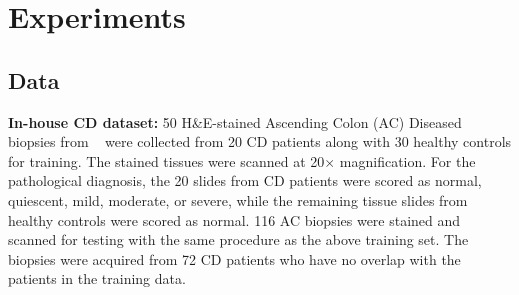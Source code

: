 \documentclass[times,twocolumn,final]{elsarticle}
\begin{document}

\section{Experiments}
\subsection{Data}
\textbf{In-house CD dataset:} 50 H\&E-stained Ascending Colon (AC) Diseased biopsies from ~\citep{bao2021cross} were collected from 20 CD patients along with 30 healthy controls for training. The stained tissues were scanned at 20$\times$ magnification. For the pathological diagnosis, the 20 slides from CD patients were scored as normal, quiescent, mild, moderate, or severe, while the remaining tissue slides from healthy controls were scored as normal. 116 AC biopsies were stained and scanned for testing with the same procedure as the above training set. The biopsies were acquired from 72 CD patients who have no overlap with the patients in the training data.
\end{document}
